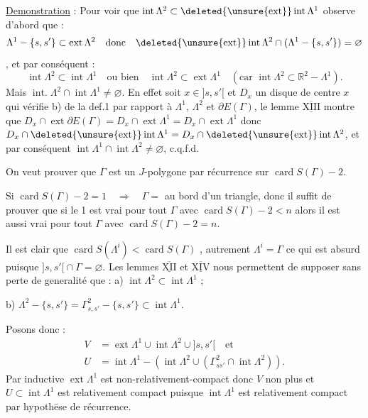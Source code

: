 \uline{Demonstration} : Pour voir que $\operatorname{int}\Lambda^2\subset\deleted{\unsure{\operatorname{ext}}}\operatorname{int}\Lambda^1$  observe d'abord que :
\[
\Lambda^1-\{s,s'\}\subset\operatorname{ext}\Lambda^2\quad\text{donc}\quad\deleted{\unsure{\operatorname{ext}}}\operatorname{int}\Lambda^2\cap(\Lambda^1-\{s,s'\})=\varnothing
\]
, et par conséquent :
\[
\operatorname{int}\Lambda^2\subset\operatorname{int}\Lambda^1\quad\text{ou bien}\quad\operatorname{int}\Lambda^2\subset\operatorname{ext}\Lambda^1\quad(\text{car }\operatorname{int}\Lambda^2\subset\mathbb R^2-\Lambda^1).
\]
Mais $\operatorname{int.}\Lambda^2\cap\operatorname{int}\Lambda^1\ne\varnothing$. En effet soit $x\in{]s,s'[}$ et $D_x$ un disque de centre $x$ qui vérifie b) de la def.1 par rapport à $\Lambda^1$, $\Lambda^2$ et $\partial E(\Gamma)$, le lemme $\underline{\overline{\mathrm{XIII}}}$ montre que $D_x\cap\operatorname{ext}\partial E(\Gamma)=D_x\cap\operatorname{ext}\Lambda^1=D_x\cap\operatorname{ext}\Lambda^1$ donc $D_x\cap\deleted{\unsure{\operatorname{ext}}}\operatorname{int}\Lambda^1=D_x\cap\deleted{\unsure{\operatorname{ext}}}\operatorname{int}\Lambda^2$, et par conséquent $\operatorname{int}\Lambda^1\cap\operatorname{int}\Lambda^2\ne\varnothing$, c.q.f.d.

On veut prouver que $\Gamma$ est un $J$-polygone par récurrence sur $\operatorname{card}S(\Gamma)-2$.

Si $\operatorname{card}S(\Gamma)-2=1\quad\Rightarrow\quad\Gamma={}$ au bord d'un triangle, donc il suffit de prouver que si le  1 est vrai pour tout $\Gamma$ avec $\operatorname{card}S(\Gamma)-2<n$ alors il est aussi vrai pour tout $\Gamma$ avec $\operatorname{card}S(\Gamma)-2=n$.

Il est clair que $\operatorname{card}S(\Lambda^i)<\operatorname{card}S(\Gamma)$ , autrement $\Lambda^i=\Gamma$ ce qui est absurd puisque $ {]s,s'[}\cap\Gamma=\varnothing$. Les lemmes $\underline{\overline{\mathrm{XII}}}$ et $\underline{\overline{\mathrm{XIV}}}$  nous permettent de supposer sans perte de generalité que : a) $\operatorname{int}\Lambda^2\subset\operatorname{int}\Lambda^1$ ;

b) $\Lambda^2-\{s,s'\}=\Gamma^2_{s,s'}-\{s,s'\}\subset\operatorname{int}\Lambda^1$.

Posons donc :
\[
\begin{aligned}
V&=\operatorname{ext}\Lambda^1\cup\operatorname{int}\Lambda^2\cup{]s,s'[}\quad\text{et}\\
U&=\operatorname{int}\Lambda^1-(\operatorname{int}\Lambda^2\cup(\Gamma^2_{ss'}\cap\operatorname{int}\Lambda^2)).
\end{aligned}
\]
Par  inductive $\operatorname{ext}\Lambda^1$ est non-relativement-compact donc $V$ non plus et $U\subset\operatorname{int}\Lambda^1$ est relativement compact puisque $\operatorname{int}\Lambda^1$ est relativement compact par hypothēse de récurrence.

